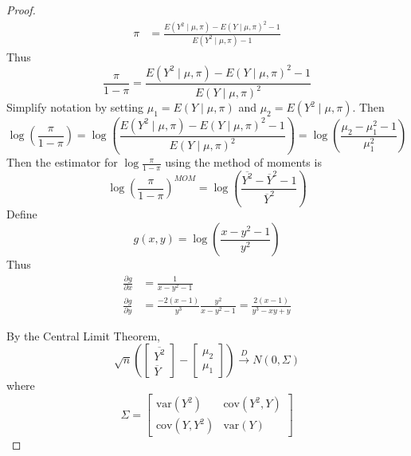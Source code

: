 \documentclass[letterpaper, 12pt]{article}
\newcommand{\cov}{\text{cov}}
\newcommand{\var}{\text{var}}
\newcommand{\sbs}{\;|\;} %
\begin{document}
\begin{enumerate}
\begin{enumerate}
\begin{proof}
\begin{align*}
\pi &= \frac{E(Y^2 \mid \mu, \pi) - E(Y \mid \mu, \pi)^2 - 1}{E(Y^2 \sbs \mu, \pi) - 1}
\end{align*}
Thus
\[
\frac{\pi}{1-\pi} 
=
\frac{E(Y^2 \mid \mu, \pi) - E(Y \mid \mu, \pi)^2 - 1}{E(Y \sbs \mu, \pi)^2}
\]
Simplify notation by setting $\mu_1 = E(Y \mid \mu, \pi)$ and $\mu_2 = E(Y^2 \mid \mu, \pi)$. 
Then
\[
\log \left(
\frac{\pi}{1-\pi}
\right)
=
\log
\left(
\frac{E(Y^2 \mid \mu, \pi) - E(Y \mid \mu, \pi)^2 - 1}{E(Y \sbs \mu, \pi)^2}
\right)
=
\log
\left(
\frac{\mu_2 -\mu_1^2 - 1}{\mu_1^2}
\right)
\]
Then the estimator for $\log\frac{\pi}{1-\pi}$ using the method of moments is
\[
\log \left( \frac{\pi}{1-\pi} \right) ^{MOM} =
\log \left(
\frac{\overline{Y^2} - \overline{Y}^2 - 1}{\overline{Y}^2}
\right)
\]
Define 
\[
g(x,y) = \log\left(\frac{x - y^2 - 1}{y^2}\right)
\]
Thus
\begin{align*}
\frac{\partial g}{\partial x} 
&= \frac{1}{x - y^2 - 1}
\\
\frac{\partial g}{\partial y}
&=
\frac{-2(x-1)}{y^3} \frac{y^2}{x - y^2 -1}
=
\frac{2(x-1)}{y^3 - xy +y} 
\end{align*}

By the Central Limit Theorem,
\[
\sqrt{n}
\left(
\begin{bmatrix}
\overline{Y^2}\\
\overline{Y}
\end{bmatrix}
-
\begin{bmatrix}
\mu_2 
\\
\mu_1
\end{bmatrix}
\right)
\xrightarrow{D}
N(0,\Sigma)
\]
where 
\[
\Sigma = \begin{bmatrix}
\var(Y^2) & \cov(Y^2, Y) \\
\cov(Y, Y^2) & \var(Y)
\end{bmatrix}
\]


\end{proof}
\end{enumerate}
\end{enumerate}
\end{document}
